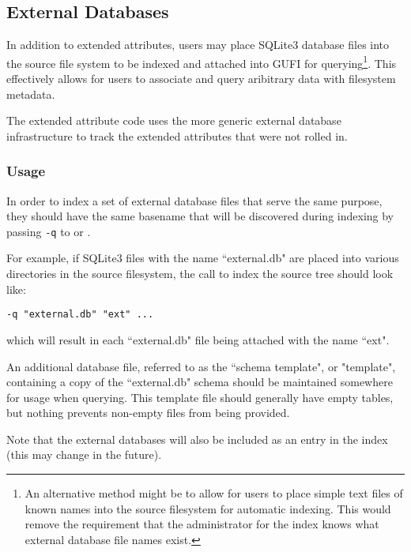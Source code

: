 \subsection{External Databases}
In addition to extended attributes, users may place SQLite3 database
files into the source file system to be indexed and attached into GUFI
for querying\footnote{An alternative method might be to allow for
users to place simple text files of known names into the source
filesystem for automatic indexing. This would remove the requirement
that the administrator for the index knows what external database file
names exist.}. This effectively allows for users to associate and
query aribitrary data with filesystem metadata.

The extended attribute code uses the more generic external database
infrastructure to track the extended attributes that were not rolled
in.

\subsubsection{Usage}
In order to index a set of external database files that serve the same
purpose, they should have the same basename that will be discovered
during indexing by passing \texttt{-q} to \gufidirindex or
\gufidirtrace.

For example, if SQLite3 files with the name ``external.db" are placed
into various directories in the source filesystem, the call to index
the source tree should look like:

\hspace*{\fill} \gufidirindex \texttt{-q "external.db" "ext" ...} \hspace*{\fill}

which will result in each ``external.db" file being attached with the
name ``ext".

An additional database file, referred to as the ``schema template", or
"template", containing a copy of the ``external.db" schema should be
maintained somewhere for usage when querying. This template file
should generally have empty tables, but nothing prevents non-empty
files from being provided.

Note that the external databases will also be included as an entry in
the index (this may change in the future).
